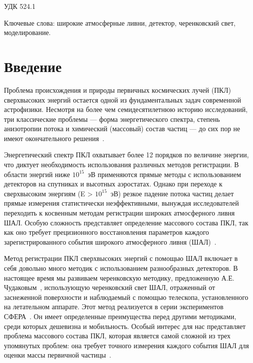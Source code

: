 \documentclass[aps,preprint,showpacs,aps,amsmath,showkeys,nobibnotes,nofootinbib,footnotes,superscriptaddress]{revtex4-2}
\begin{document}
	
	
	\begin{abstract}
		...
	\end{abstract}
	
	\maketitle


	УДК 524.1

	Ключевые слова: широкие атмосферные ливни, детектор, черенковский свет, моделирование.


    \section{Введение}

Проблема происхождения и природы первичных космических лучей (ПКЛ) сверхвысоких энергий остается одной из фундаментальных задач современной астрофизики. Несмотря на более чем семидесятилетнюю историю исследований, три классические проблемы — форма энергетического спектра, степень анизотропии потока и химический (массовый) состав частиц — до сих пор не имеют окончательного решения~\cite{KAMPERT2012660}. 

Энергетический спектр ПКЛ охватывает более 12 порядков по величине энергии, что диктует необходимость использования различных методов регистрации. В области энергий ниже $10^{15}$~эВ применяются прямые методы с использованием детекторов на спутниках и высотных аэростатах. Однако при переходе к сверхвысоким энергиям (E > $10^{15}$~эВ) резкое падение потока частиц делает прямые измерения статистически неэффективными, вынуждая исследователей переходить к косвенным методам регистрации широких атмосферного ливня ШАЛ. Особую сложность представляет определение массового состава ПКЛ, так как оно требует прецизионного восстановления параметров каждого зарегистрированного события широкого атмосферного ливня (ШАЛ)~\cite{KAMPERT2012660}.

Метод регистрации ПКЛ сверхвысоких энергий с помощью ШАЛ включает в себя довольно много методик с использованием разнообразных детекторов. В настоящее время мы развиваем черенковскую методику, предложенную А.Е. Чудаковым~\cite{Chudakov1972}, использующую черенковский свет ШАЛ, отраженный от заснеженной поверхности и наблюдаемый с помощью телескопа, установленного на летательном аппарате. Этот метод реализуется в серии экспериментов СФЕРА~\cite{Chernov2015, 2020_SPHERE_JINST, Chernov2024}. Он имеет определенные преимущества перед другими методиками, среди которых дешевизна и мобильность. Особый интерес для нас представляет проблема массового состава ПКЛ, которая является самой сложной из трех упомянутых проблем: она требует точного измерения каждого события ШАЛ для оценки массы первичной частицы~\cite{mass}.
\end{document}
